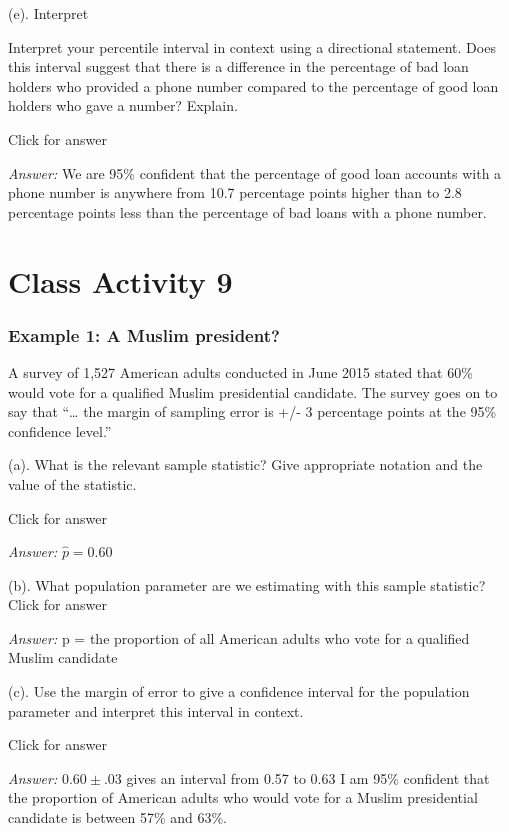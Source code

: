 \documentclass[
]{book}
\begin{document}
(e). Interpret

Interpret your percentile interval in context using a directional statement. Does this interval suggest that there is a difference in the percentage of bad loan holders who provided a phone number compared to the percentage of good loan holders who gave a number? Explain.

Click for answer

\emph{Answer:} We are 95\% confident that the percentage of good loan accounts with a phone number is anywhere from 10.7 percentage points higher than to 2.8 percentage points less than the percentage of bad loans with a phone number.

\hypertarget{class-activity-9}{%
\chapter{Class Activity 9}\label{class-activity-9}}

\hypertarget{example-1-a-muslim-president}{%
\subsection{Example 1: A Muslim president?}\label{example-1-a-muslim-president}}

A survey of 1,527 American adults conducted in June 2015 stated that 60\% would vote for a qualified Muslim presidential candidate. The survey goes on to say that ``\ldots{} the margin of sampling error is +/- 3 percentage points at the 95\% confidence level.''

(a). What is the relevant sample statistic? Give appropriate notation and the value of the statistic.

Click for answer

\emph{Answer:} \(\hat{p} = 0.60\)

(b). What population parameter are we estimating with this sample statistic?\\

Click for answer

\emph{Answer:} p = the proportion of all American adults who vote for a qualified Muslim candidate

(c). Use the margin of error to give a confidence interval for the population parameter and interpret this interval in context.

Click for answer

\emph{Answer:} \(0.60 \pm .03\) gives an interval from 0.57 to 0.63
I am 95\% confident that the proportion of American adults who would vote for a Muslim presidential candidate is between 57\% and 63\%.
\end{document}
